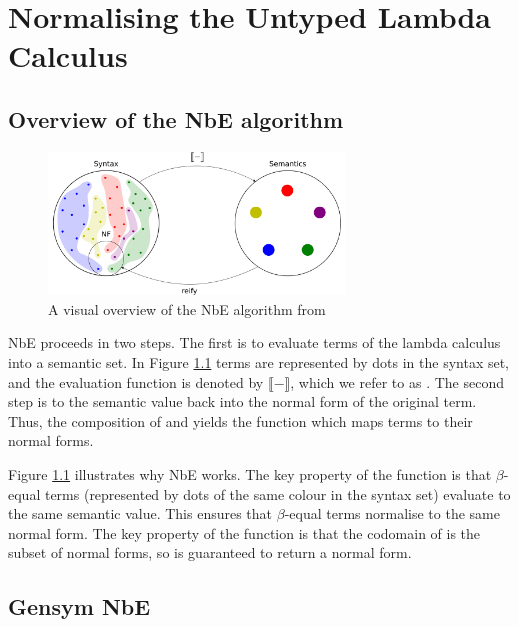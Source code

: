 \chapter{Normalising the Untyped Lambda Calculus}
\label{chap:untypednbe}

\section{Overview of the NbE algorithm}

\begin{figure}[h]
    \centering
    \includegraphics[width=0.7\textwidth]{./images/nbe_diagram}
    \caption{A visual overview of the NbE algorithm from \cite{slides}}
    \label{fig:nbeOverview}
\end{figure}

NbE proceeds in two steps. The first is to evaluate terms of the lambda calculus into a semantic set. In Figure \ref{fig:nbeOverview} terms are represented by dots in the syntax set, and the evaluation function is denoted by $\llbracket - \rrbracket$, which we refer to as . The second step is to  the semantic value back into the normal form of the original term. Thus, the composition of  and  yields the  function which maps terms to their normal forms. 

Figure \ref{fig:nbeOverview} illustrates why NbE works. The key property of the  function is that $\beta$-equal terms (represented by dots of the same colour in the syntax set) evaluate to the same semantic value. This ensures that $\beta$-equal terms normalise to the same normal form. The key property of the  function is that the codomain of  is the subset of normal forms, so  is guaranteed to return a normal form. 

\section{Gensym NbE}

